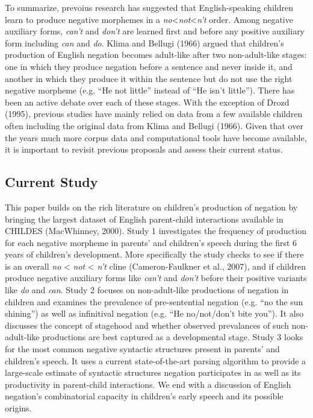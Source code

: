 \documentclass[man,floatsintext,draftall]{apa6}
\begin{document}
To summarize, prevoius research has suggested that English-speaking children learn to produce negative morphemes in a \emph{no}\textless{}\emph{not}\textless{}\emph{n't} order. Among negative auxiliary forms, \emph{can't} and \emph{don't} are learned first and before any positive auxiliary form including \emph{can} and \emph{do}. Klima and Bellugi (1966) argued that children's production of English negation becomes adult-like after two non-adult-like stages: one in which they produce negation before a sentence and never inside it, and another in which they produce it within the sentence but do not use the right negative morpheme (e.g. \enquote{He not little} instead of \enquote{He isn't little}). There has been an active debate over each of these stages. With the exception of Drozd (1995), previous studies have mainly relied on data from a few available children often including the original data from Klima and Bellugi (1966). Given that over the years much more corpus data and computational tools have become available, it is important to revisit previous proposals and assess their current status.

\hypertarget{current-study}{%
\subsection{Current Study}\label{current-study}}

This paper builds on the rich literature on children's production of negation by bringing the largest dataset of English parent-child interactions available in CHILDES (MacWhinney, 2000). Study 1 investigates the frequency of production for each negative morpheme in parents' and children's speech during the first 6 years of children's development. More specifically the study checks to see if there is an overall \emph{no} \textless{} \emph{not} \textless{} \emph{n't} cline (Cameron-Faulkner et al., 2007), and if children produce negative auxiliary forms like \emph{can't} and \emph{don't} before their positive variants like \emph{do} and \emph{can}. Study 2 focuses on non-adult-like productions of negation in children and examines the prevalence of pre-sentential negation (e.g. \enquote{no the sun shining}) as well as infinitival negation (e.g. \enquote{He no/not/don't bite you}). It also discusses the concept of stagehood and whether observed prevalances of such non-adult-like productions are best captured as a developmental stage. Study 3 looks for the most common negative syntactic structures present in parents' and children's speech. It uses a current state-of-the-art parsing algorithm to provide a large-scale estimate of syntactic structures negation participates in as well as its productivity in parent-child interactions. We end with a discussion of English negation's combinatorial capacity in children's early speech and its possible origins.
\end{document}
